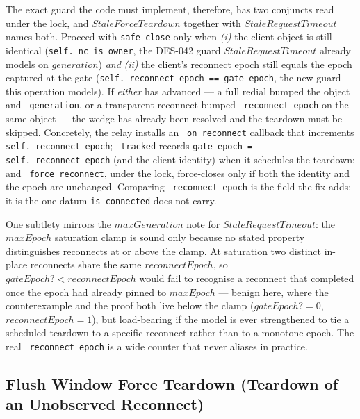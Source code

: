 \documentclass[a4paper,10pt,fleqn]{article}
\begin{document}
The exact guard the code must implement, therefore, has two conjuncts
read under the lock, and $StaleForceTeardown$ together with
$StaleRequestTimeout$ names both.  Proceed with \texttt{safe\_close}
only when \emph{(i)} the client object is still identical
(\texttt{self.\_nc is owner}, the DES-042 guard $StaleRequestTimeout$
already models on $generation$) \emph{and} \emph{(ii)} the client's
reconnect epoch still equals the epoch captured at the gate
(\texttt{self.\_reconnect\_epoch == gate\_epoch}, the new guard this
operation models).  If \emph{either} has advanced --- a full redial
bumped the object and \texttt{\_generation}, or a transparent reconnect
bumped \texttt{\_reconnect\_epoch} on the same object --- the wedge has
already been resolved and the teardown must be skipped.  Concretely, the
relay installs an \texttt{\_on\_reconnect} callback that increments
\texttt{self.\_reconnect\_epoch}; \texttt{\_tracked} records
\texttt{gate\_epoch = self.\_reconnect\_epoch} (and the client identity)
when it schedules the teardown; and \texttt{\_force\_reconnect}, under
the lock, force-closes only if both the identity and the epoch are
unchanged.  Comparing \texttt{\_reconnect\_epoch} is the field the fix
adds; it is the one datum \texttt{is\_connected} does not carry.

One subtlety mirrors the $maxGeneration$ note for $StaleRequestTimeout$:
the $maxEpoch$ saturation clamp is sound only because no stated property
distinguishes reconnects at or above the clamp.  At saturation two
distinct in-place reconnects share the same $reconnectEpoch$, so
$gateEpoch? < reconnectEpoch$ would fail to recognise a reconnect that
completed once the epoch had already pinned to $maxEpoch$ --- benign
here, where the counterexample and the proof both live below the clamp
($gateEpoch? = 0$, $reconnectEpoch = 1$), but load-bearing if the model
is ever strengthened to tie a scheduled teardown to a specific reconnect
rather than to a monotone epoch.  The real \texttt{\_reconnect\_epoch}
is a wide counter that never aliases in practice.

\subsection{Flush Window Force Teardown (Teardown of an Unobserved
Reconnect)}
\end{document}
